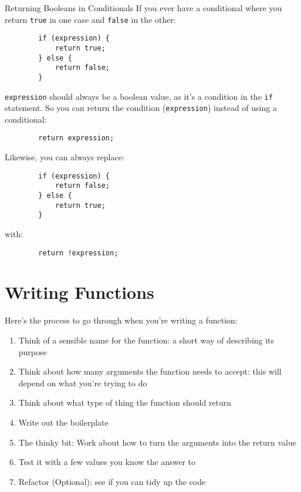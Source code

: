 \pagebreak

\begin{infobox}{Returning Booleans in Conditionals}
    If you ever have a conditional where you return \texttt{true} in one case and \texttt{false} in the other:

    \begin{verbatim}
        if (expression) {
            return true;
        } else {
            return false;
        }
    \end{verbatim}

    \texttt{expression} should always be a boolean value, as it's a condition in the \texttt{if} statement. So you can return the condition (\texttt{expression}) instead of using a conditional:

    \begin{verbatim}
        return expression;
    \end{verbatim}

    Likewise, you can always replace:

    \begin{verbatim}
        if (expression) {
            return false;
        } else {
            return true;
        }
    \end{verbatim}

    with:

    \begin{verbatim}
        return !expression;
    \end{verbatim}

\end{infobox}

\pagebreak

\section{Writing Functions}

Here's the process to go through when you're writing a function:

\begin{enumerate}
    \item Think of a sensible name for the function: a short way of describing its purpose
    \item Think about how many arguments the function needs to accept: this will depend on what you're trying to do
    \item Think about what type of thing the function should return
    \item Write out the boilerplate
    \item The thinky bit: Work about how to turn the arguments into the return value
    \item Test it with a few values you know the answer to
    \item Refactor (Optional): see if you can tidy up the code
\end{enumerate}


